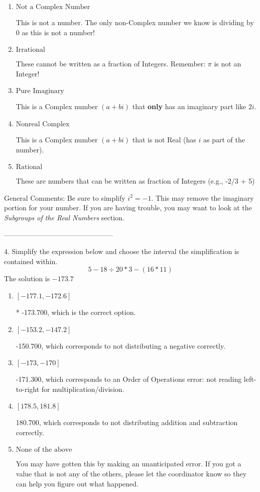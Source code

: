 \documentclass{extbook}[14pt]
\begin{document}
\begin{enumerate}[label=\Alph*.] 
\item $ \text{Not a Complex Number} $ 

 This is not a number. The only non-Complex number we know is dividing by 0 as this is not a number! 
\item $ \text{Irrational} $ 

 These cannot be written as a fraction of Integers. Remember: $\pi$ is not an Integer! 
\item $ \text{Pure Imaginary} $ 

 This is a Complex number $(a+bi)$ that \textbf{only} has an imaginary part like $2i$. 
\item $ \text{Nonreal Complex} $ 

 This is a Complex number $(a+bi)$ that is not Real (has $i$ as part of the number). 
\item $ \text{Rational} $ 

 These are numbers that can be written as fraction of Integers (e.g., -2/3 + 5) 
\end{enumerate} 
 
General Comments: Be sure to simplify $i^2 = -1$. This may remove the imaginary portion for your number. If you are having trouble, you may want to look at the \textit{Subgroups of the Real Numbers} section.

-----------------------------------------------

4. Simplify the expression below and choose the interval the simplification is contained within.
\[ 5 - 18 \div 20 * 3 - (16 * 11) \] 
The solution is $ -173.7 $ 

\begin{enumerate}[label=\Alph*.] 
\item $ [-177.1, -172.6] $ 

 * -173.700, which is the correct option. 
\item $ [-153.2, -147.2] $ 

  -150.700, which corresponds to not distributing a negative correctly. 
\item $ [-173, -170] $ 

  -171.300, which corresponds to an Order of Operations error: not reading left-to-right for multiplication/division. 
\item $ [178.5, 181.8] $ 

  180.700, which corresponds to not distributing addition and subtraction correctly. 
\item $ \text{None of the above} $ 

  You may have gotten this by making an unanticipated error. If you got a value that is not any of the others, please let the coordinator know so they can help you figure out what happened. 
\end{enumerate} 
 
\end{document}
